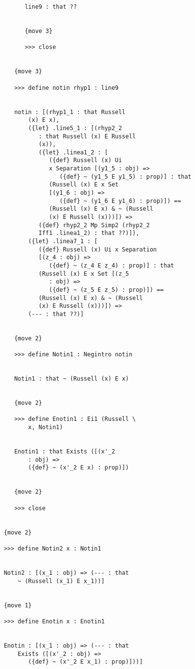 \documentclass[12pt]{article}
\begin{document}
\begin{verbatim}
            line9 : that ??


            {move 3}

            >>> close


         {move 3}

         >>> define notin rhyp1 : line9


         notin : [(rhyp1_1 : that Russell 
             (x) E x), 
             ({let} .line5_1 : [(rhyp2_2 
                : that Russell (x) E Russell 
                (x)), 
                ({let} .linea1_2 : [
                   ({def} Russell (x) Ui 
                   x Separation [(y1_5 : obj) => 
                      ({def} ~ (y1_5 E y1_5) : prop)] : that 
                   (Russell (x) E x Set 
                   [(y1_6 : obj) => 
                      ({def} ~ (y1_6 E y1_6) : prop)]) == 
                   (Russell (x) E x) & ~ (Russell 
                   (x) E Russell (x)))]) => 
                ({def} rhyp2_2 Mp Simp2 (rhyp2_2 
                Iff1 .linea1_2) : that ??)]), 
             ({let} .linea7_1 : [
                ({def} Russell (x) Ui x Separation 
                [(z_4 : obj) => 
                   ({def} ~ (z_4 E z_4) : prop)] : that 
                (Russell (x) E x Set [(z_5 
                   : obj) => 
                   ({def} ~ (z_5 E z_5) : prop)]) == 
                (Russell (x) E x) & ~ (Russell 
                (x) E Russell (x)))]) => 
             (--- : that ??)]


         {move 2}

         >>> define Notin1 : Negintro notin


         Notin1 : that ~ (Russell (x) E x)


         {move 2}

         >>> define Enotin1 : Ei1 (Russell \
             x, Notin1)


         Enotin1 : that Exists ([(x'_2 
             : obj) => 
             ({def} ~ (x'_2 E x) : prop)])


         {move 2}

         >>> close


      {move 2}

      >>> define Notin2 x : Notin1


      Notin2 : [(x_1 : obj) => (--- : that 
          ~ (Russell (x_1) E x_1))]


      {move 1}

      >>> define Enotin x : Enotin1


      Enotin : [(x_1 : obj) => (--- : that 
          Exists ([(x'_2 : obj) => 
             ({def} ~ (x'_2 E x_1) : prop)]))]



\end{verbatim}
\end{document}
